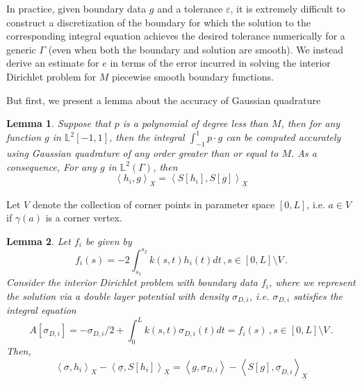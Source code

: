 \documentclass[12pt,times]{elsarticle}
\newcommand{\usigma}{\underline{\sigma}}
\newcommand{\uX}{\underline{X}}
\newtheorem{lem}{Lemma}
\begin{document}
{In practice, given boundary data $g$ and a tolerance $\varepsilon$, it is extremely difficult to construct a discretization of the boundary for which the solution to the corresponding integral equation achieves the desired tolerance numerically for a generic $\Gamma$ (even when both the boundary and solution are smooth). 
We instead derive an estimate for $e$ in terms of the error incurred in solving the interior Dirichlet problem for $M$ piecewise smooth boundary functions. 

But first, we present a lemma about the accuracy of Gaussian quadrature
\begin{lem}
\label{lem:b1}
Suppose that $p$ is a polynomial of degree less than $M$, then for any function $g$ in $\mathbb{L}^{2}[-1,1]$, then the integral
$\int_{-1}^{1} p \cdot g$ can be computed accurately using Gaussian quadrature of any order greater than or equal to $M$.
As a consequence, For any $g$ in $\mathbb{L}^{2}(\Gamma)$, then 
\begin{equation}
\left<h_{i},g \right>_{X} = \left< S[h_{i}], S[g] \right>_{\uX}
\end{equation}
\end{lem}

Let $V$ denote the collection of corner points in parameter space $[0,L]$, i.e. $a \in V$ if $\gamma(a)$ is a corner vertex.

\begin{lem}
\label{lem:b2}
Let $f_{i}$ be given by
\begin{equation}
f_{i}(s) = -2 \int_{s_{1}}^{s_{2}} k(s,t) h_{i}(t) dt \, , s\in [0,L] \setminus V \, . \label{eq:deff}
\end{equation}
Consider the interior Dirichlet problem with boundary data $f_{i}$, where we represent the solution via a double layer potential with density $\sigma_{D,i}$, i.e. $\sigma_{D,i}$ satisfies the integral equation
\begin{equation}
A[\sigma_{D,i}] = -\sigma_{D,i}/2 + \int_{0}^{L} k(s,t) \sigma_{D,i}(t) dt  = f_{i}(s) \, , s\in [0,L] \setminus V \, . 
\end{equation}
Then,
\begin{equation}
\left< \sigma, h_{i} \right>_{X} -  \left< \usigma, S[h_{i}] \right>_{\uX} = 
\left< g, \sigma_{D,i} \right> - \left< S[g], \usigma_{D,i} \right>_{\uX}
\end{equation}
\end{lem}

}
\end{document}
